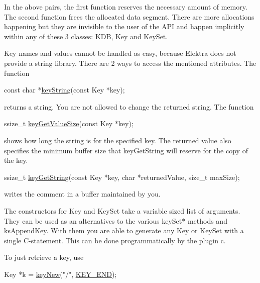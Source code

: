 In the above pairs, the first function reserves the necessary amount of memory. The second function frees the allocated data segment. There are more allocations happening but they are invisible to the user of the A\+PI and happen implicitly within any of these 3 classes\+: {\ttfamily K\+DB}, {\ttfamily Key} and {\ttfamily Key\+Set}.

Key names and values cannot be handled as easy, because Elektra does not provide a string library. There are 2 ways to access the mentioned attributes. The function


\begin{DoxyCode}
\textcolor{keyword}{const} \textcolor{keywordtype}{char} *\hyperlink{group__keyvalue_ga880936f2481d28e6e2acbe7486a21d05}{keyString}(\textcolor{keyword}{const} Key *key);
\end{DoxyCode}


returns a string. You are not allowed to change the returned string. The function


\begin{DoxyCode}
ssize\_t \hyperlink{group__keyvalue_gae326672fffb7474abfe9baf53b73217e}{keyGetValueSize}(\textcolor{keyword}{const} Key *key);
\end{DoxyCode}


shows how long the string is for the specified key. The returned value also specifies the minimum buffer size that {\ttfamily key\+Get\+String} will reserve for the copy of the key.


\begin{DoxyCode}
ssize\_t \hyperlink{group__keyvalue_ga41b9fac5ccddafe407fc0ae1e2eb8778}{keyGetString}(\textcolor{keyword}{const} Key *key, \textcolor{keywordtype}{char} *returnedValue, \textcolor{keywordtype}{size\_t} maxSize);
\end{DoxyCode}


writes the comment in a buffer maintained by you.

The constructors for {\ttfamily Key} and {\ttfamily Key\+Set} take a variable sized list of arguments. They can be used as an alternatives to the various {\ttfamily key\+Set$\ast$} methods and {\ttfamily ks\+Append\+Key}. With them you are able to generate any {\ttfamily Key} or {\ttfamily Key\+Set} with a single C-\/statement. This can be done programmatically by the plugin {\ttfamily c}.

To just retrieve a key, use


\begin{DoxyCode}
Key *k = \hyperlink{group__key_gad23c65b44bf48d773759e1f9a4d43b89}{keyNew}(\textcolor{stringliteral}{"/"}, \hyperlink{group__key_gga9b703ca49f48b482def322b77d3e6bc8aa8adb6fcb92dec58fb19410eacfdd403}{KEY\_END});
\end{DoxyCode}


